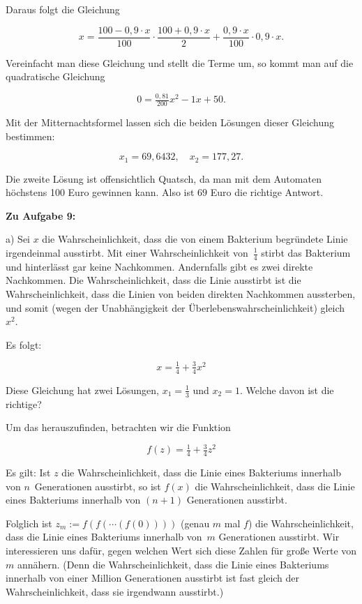 \documentclass{article}
\begin{document}
Daraus folgt die Gleichung

\[ x = \frac{100 - 0,9 \cdot x}{100} \cdot \frac{100 + 0,9 \cdot x}{2} + \frac{0,9 \cdot x}{100} \cdot 0,9 \cdot x. \]

Vereinfacht man diese Gleichung und stellt die Terme um, so kommt man auf die quadratische Gleichung

\[ 0 = \tfrac{0,81}{200} x^2 - 1 x + 50. \]

Mit der Mitternachtsformel lassen sich die beiden Lösungen dieser Gleichung bestimmen:

\[
  x_1 = 69,6432, \quad
  x_2 = 177,27.
\]

Die zweite Lösung ist offensichtlich Quatsch, da man mit dem Automaten höchstens 100 Euro gewinnen kann.
Also ist $69$ Euro die richtige Antwort.

\textbf{Zu Aufgabe 9:}

a) Sei $x$ die Wahrscheinlichkeit, dass die von einem Bakterium begründete Linie irgendeinmal ausstirbt. Mit einer Wahrscheinlichkeit von~$\tfrac{1}{4}$ stirbt das Bakterium und hinterlässt gar keine Nachkommen. Andernfalls gibt es zwei direkte Nachkommen. Die Wahrscheinlichkeit, dass die Linie ausstirbt ist die Wahrscheinlichkeit, dass die Linien von beiden direkten Nachkommen aussterben, und somit (wegen der Unabhängigkeit der Überlebenswahrscheinlichkeit) gleich~$x^2$.

Es folgt:

\[ x = \tfrac{1}{4} + \tfrac{3}{4} x^2 \]

Diese Gleichung hat zwei Lösungen, $x_1 = \tfrac{1}{3}$ und $x_2 = 1$. Welche davon ist die richtige?

Um das herauszufinden, betrachten wir die Funktion

\[ f(z) = \tfrac{1}{4} + \tfrac{3}{4} z^2 \]

Es gilt: Ist $z$ die Wahrscheinlichkeit, dass die Linie eines Bakteriums innerhalb von $n$~Generationen ausstirbt, so ist $f(x)$ die Wahrscheinlichkeit, dass die Linie eines Bakteriums innerhalb von $(n+1)$ Generationen ausstirbt.

Folglich ist $z_m := f(f(\cdots(f(0))))$ (genau $m$ mal $f$) die Wahrscheinlichkeit, dass die Linie eines Bakteriums innerhalb von~$m$ Generationen ausstirbt.
Wir interessieren uns dafür, gegen welchen Wert sich diese Zahlen für große Werte von $m$ annähern. (Denn die Wahrscheinlichkeit, dass die Linie eines Bakteriums innerhalb von einer Million Generationen ausstirbt ist fast gleich der Wahrscheinlichkeit, dass sie irgendwann ausstirbt.)
\end{document}
